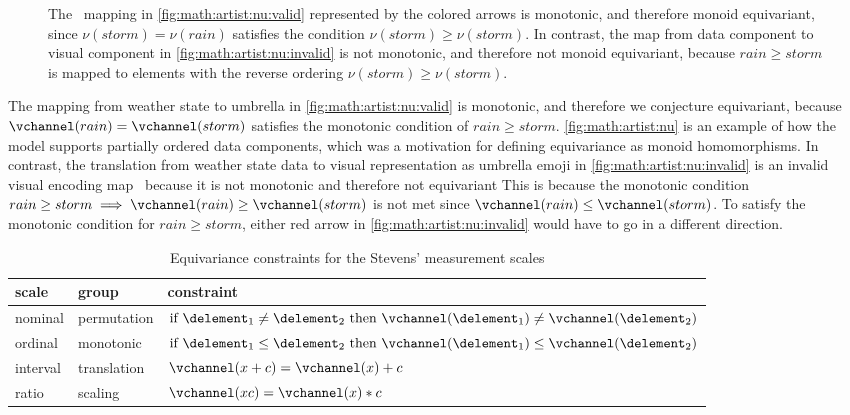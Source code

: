 \documentclass[../main.tex]{subfiles}
\begin{document}
\begin{figure}[htb]
\begin{subfigure}{.49\textwidth}
    \caption{}
    \label{fig:math:artist:nu:invalid}
  \end{subfigure}
  \caption{ The \vchannel\ mapping in \autoref{fig:math:artist:nu:valid} represented by the colored arrows is monotonic, and therefore monoid equivariant,  since $\nu(storm)=\nu(rain)$ satisfies the condition $\nu(storm) \geq \nu(storm)$. In contrast, the map from data component to visual component in \autoref{fig:math:artist:nu:invalid} is not monotonic, and therefore not monoid equivariant, because $rain \geq storm$ is mapped to elements with the reverse ordering $\nu(storm) \geq \nu(storm)$.}
  \label{fig:math:artist:nu}
\end{figure}
The mapping from weather state to umbrella in \autoref{fig:math:artist:nu:valid} is monotonic, and therefore we conjecture equivariant, because $\vchannel(rain) = \vchannel(storm)$ satisfies the monotonic condition of $rain \geq storm$. \autoref{fig:math:artist:nu} is an example of how the model supports partially ordered data components, which was a motivation for defining equivariance as monoid homomorphisms. In contrast, the translation from weather state data to visual representation as umbrella emoji in \autoref{fig:math:artist:nu:invalid} is an invalid visual encoding map \vchannel\ because it is not monotonic and therefore not equivariant This is because the monotonic condition \(rain \geq storm \implies \vchannel(rain) \geq  \vchannel(storm)\) is not met since \(\vchannel(rain) \leq\vchannel(storm)\). To satisfy the monotonic condition for $rain \geq storm$, either red arrow in \autoref{fig:math:artist:nu:invalid} would have to go in a different direction.

\begin{table}[H]
\centering
  \renewcommand{\arraystretch}{2}
  \begin{tabulary}{\columnwidth}{|llL|}\hline
      \textbf{scale} & \textbf{group} & \textbf{constraint}\\ \hline
      nominal & permutation &  $\text{if } \delement_1 \neq \delement_2 \text{ then } \vchannel (\delement_1) \neq\vchannel(\delement_2)$\\
      ordinal &  monotonic & $\text{if } \delement_1 \leq \delement_2 \text{ then } \vchannel (\delement_1) \leq \vchannel(\delement_2)$\\
      interval &  translation &  $\vchannel (x + c) = \vchannel(x) + c$ \\
      ratio &  scaling &  $\vchannel(xc) = \vchannel(x)*c $\\ \hline
  \end{tabulary}
  \caption{Equivariance constraints for the Stevens' measurement scales\cite{MeasurementScalesStatistics}}
  \label{tab:math:artist:nu}
\end{table}
\end{document}
